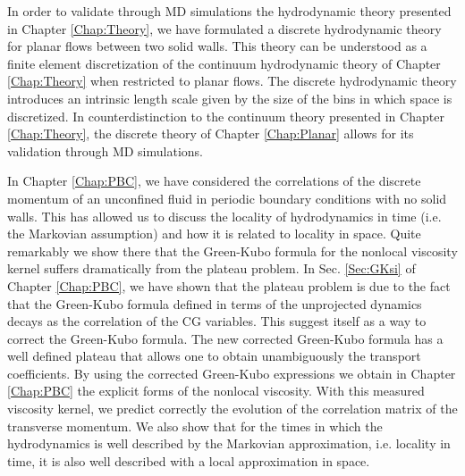 \documentclass[b5paper,openright,10pt]{book}
\begin{document}

In order  to validate through  MD simulations the  hydrodynamic theory
presented  in Chapter  \ref{Chap:Theory}, we  have formulated  a
discrete hydrodynamic theory for planar flows between two solid walls.
This theory  can be understood  as a finite element  discretization of
the continuum  hydrodynamic theory  of Chapter  \ref{Chap:Theory} when
restricted  to   planar  flows.   The  discrete   hydrodynamic  theory
introduces an intrinsic length scale given  by the size of the bins in
which space is discretized.
In counterdistinction
to  the continuum  theory  presented in Chapter \ref{Chap:Theory},  the
discrete theory of Chapter \ref{Chap:Planar}
allows for its validation through MD simulations.


In Chapter \ref{Chap:PBC}, we have  considered the correlations of the
discrete  momentum  of  an   unconfined  fluid  in  periodic  boundary
conditions with no solid walls.   This has allowed us to discuss
the locality of hydrodynamics in  time (i.e. the Markovian assumption)
and how it is related to  locality in space.  Quite remarkably we show
there that  the Green-Kubo formula  for the nonlocal  viscosity kernel
suffers dramatically from the plateau problem.  In Sec. \ref{Sec:GKsi}
of Chapter \ref{Chap:PBC},  we have shown that the  plateau problem is
due to  the fact that the  Green-Kubo formula defined in  terms of the
unprojected dynamics  decays as the  correlation of the  CG variables.
This suggest itself  as a  way to
correct the Green-Kubo formula.   The new corrected Green-Kubo formula
has a well defined plateau that allows one to obtain unambiguously the
transport coefficients.  By using the corrected Green-Kubo expressions
we obtain in Chapter \ref{Chap:PBC} the explicit forms of the nonlocal
viscosity.  With this measured  viscosity kernel, we predict correctly
the   evolution  of   the   correlation  matrix   of  the   transverse
momentum. We  also  show  that   for  the  times  in  which  the
  hydrodynamics  is well  described  by  the Markovian  approximation,
i.e.  locality in time, it is also  well described with a local approximation
  in space.
\end{document}
